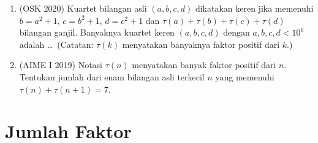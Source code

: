 \documentclass[12pt]{scrartcl}
\begin{document}
\begin{enumerate}
	\item (OSK 2020)
	Kuartet bilangan asli $(a, b, c, d)$ dikatakan keren jika memenuhi
	$b = a^{2} + 1$, $c = b^{2} + 1$, $d = c^{2} + 1$ dan
	$\tau(a) + \tau(b) + \tau(c) + \tau(d)$ bilangan ganjil.
	Banyaknya kuartet keren $(a, b, c, d)$ dengan $a, b, c, d < 10^{6}$
	adalah \dots\ (Catatan: $\tau(k)$ menyatakan banyaknya faktor positif dari $k$.)

	\item (AIME I 2019)
	Notasi $\tau(n)$ menyatakan banyak faktor positif dari $n$.
	Tentukan jumlah dari enam bilangan asli terkecil $n$ yang memenuhi
	$\tau(n) + \tau(n + 1) = 7$.

\end{enumerate}

\section{Jumlah Faktor}
\end{document}
